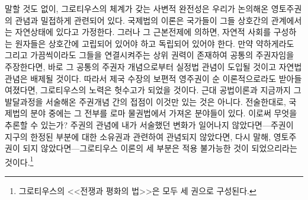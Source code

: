 말할 것도 없이,
그로티우스의 체계가 갖는 사변적 완전성은 우리가 논의해온
영토주권의 관념과 밀접하게 관련되어 있다.
국제법의 이론은 국가들이 그들 상호간의 관계에서는 자연상태에 있다고 가정한다.
그러나
그 근본전제에 의하면,
자연적 사회를 구성하는 원자들은
상호간에 고립되어 있어야 하고
독립되어 있어야 한다.
만약
약하게라도 그리고 가끔씩이라도
그들을 연결시켜주는 상위 권력이 존재하여
공통의 주권자임을 주장한다면,
바로 그 공통의 주권자 개념으로부터 실정법 관념이 도입될 것이고
자연법 관념은 배제될 것이다.
따라서 제국 수장의 보편적 영주권이
순 이론적으로라도 받아들여졌다면, 그로티우스의 노력은 헛수고가 되었을 것이다.
근대 공법이론과 지금까지 그 발달과정을 서술해온 주권개념 간의 접점이
이것만 있는 것은 아니다.
전술한대로, 국제법의 분야 중에는
그 전부를 로마 물권법에서 가져온 분야들이 있다.
이로써 무엇을 추론할 수 있는가?
주권의 관념에 내가 서술했던 변화가 일어나지 않았다면---주권이
지구의 한정된 부분에 대한 소유권과 관련하여 관념되지 않았다면,
다시 말해, 영토주권이 되지 않았다면---그로티우스 이론의 세 부분은
적용 불가능한 것이 되었으리라는 것이다.\footnote{그로티우스의
<<전쟁과 평화의 법>>은 모두 세 권으로 구성된다.}

